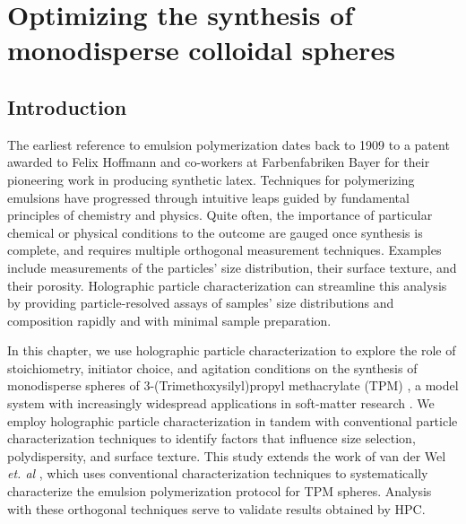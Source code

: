 \chapter{Optimizing the synthesis of monodisperse colloidal spheres}
\label{ch:synthesis}

\section{Introduction}

The earliest reference to emulsion polymerization dates back to
1909 \cite{bayer1909,finch03} to a patent awarded to Felix Hoffmann and
co-workers at Farbenfabriken Bayer for their pioneering work in producing
synthetic latex.
Techniques for polymerizing emulsions have progressed through
intuitive leaps guided by fundamental principles of chemistry
and physics.  Quite often, the importance of particular chemical
or physical conditions to the outcome are gauged once
synthesis is complete, and requires multiple orthogonal measurement
techniques. Examples include measurements of the particles' size distribution,
their surface texture, and their porosity. Holographic particle
characterization can streamline this analysis by providing particle-resolved assays
of samples' size distributions and composition rapidly and with
minimal sample preparation.



In this chapter, we use holographic particle characterization
to explore the role of stoichiometry, initiator choice, and
agitation conditions on the synthesis of monodisperse spheres of
3-(Trimethoxysilyl)propyl methacrylate (TPM) \cite{vanderwel17},
a model system with increasingly widespread applications
in soft-matter research \cite{sacanna11,liu16,vanderwel18}.
We employ holographic particle characterization
in tandem with conventional particle characterization
techniques to identify factors that influence size selection, polydispersity,
and surface texture.
This study extends the work of van der Wel \emph{et. al} \cite{vanderwel17}, which
uses conventional characterization techniques to systematically
characterize the emulsion polymerization protocol for TPM spheres.
Analysis with these orthogonal techniques serve to validate results
obtained by HPC.

